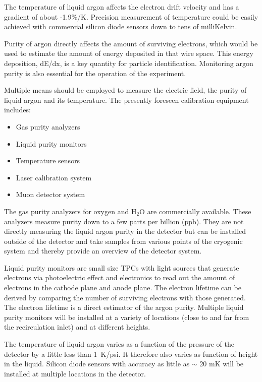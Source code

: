 The temperature of liquid argon affects the electron drift velocity and has a gradient of about -1.9\%/K. Precision measurement of temperature could be easily achieved with commercial silicon diode sensors down to tens of milliKelvin. 

Purity of argon directly affects the amount of surviving electrons, which would be used to estimate the amount of energy deposited in that wire space. This energy deposition, dE/dx, is a key quantity for particle identification. Monitoring argon purity is also essential for the operation of the experiment.

Multiple means should be employed to measure the electric field, the purity of liquid argon and its temperature. 
The presently foreseen calibration equipment includes:
\begin{itemize}
\item Gas purity analyzers
\item Liquid purity monitors
\item Temperature sensors
\item Laser calibration system
\item Muon detector system
\end{itemize}

The gas purity analyzers for oxygen and H$_{2}$O are commercially available. These analyzers measure purity down to a few parts per billion (ppb). They are not directly measuring the liquid argon purity in the detector but can be installed outside of the detector and take samples from various points of the cryogenic system and thereby provide an overview of the detector system.

Liquid purity monitors are small size TPCs with light sources that generate electrons via photoelectric effect and electronics to read out the amount of electrons in the cathode plane and anode plane. The electron lifetime can be derived by comparing the number of surviving electrons with those generated. The electron lifetime is a direct estimator of the argon purity.
Multiple liquid purity monitors will be installed at a variety of locations (close to and far from the recirculation inlet) and at different heights.

The temperature of liquid argon varies as a function of the pressure of the detector by a little less than 1~K/psi. It therefore also varies 
as function of height in the liquid. Silicon diode sensors with accuracy as little as $\sim$ 20 mK will be installed at multiple locations in the detector.

